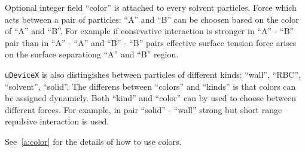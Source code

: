 Optional integer field ``color'' is attached to every solvent
particles. Force which acts between a pair of particles: ``A'' and
``B'' can be choosen based on the color of ``A'' and ``B''. For
example if consrvative interaction is stronger in ``A'' - ``B'' pair
than in ``A'' - ``A'' and ``B'' - ``B'' pairs effective surface
tension force arises on the surface separationg ``A'' and ``B''
region.

\texttt{uDeviceX} is also distingishes between particles of different
kinds: ``wall'', ``RBC'', ``solvent'', ``solid''. The differens
between ``colors'' and ``kinds'' is that colors can be assigned
dynamicly. Both ``kind'' and ``color'' can by used to choose between
different forces. For example, in pair ``solid'' - ``wall'' strong but
short range repulsive interaction is used.

See~\ref{a:color} for the details of how to use colors.
